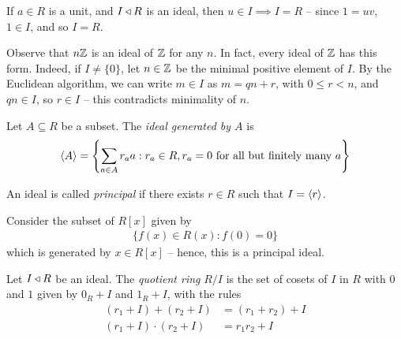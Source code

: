 \documentclass{../template/note}
\begin{document}
    \begin{remark*}
        If $a \in R$ is a unit, and $I \triangleleft R$ is an ideal, then $u \in I \implies I = R$ -- since $1 = uv$, $1 \in I$, and so $I = R$.
    \end{remark*}
    
    \begin{example}
        Observe that $n\mathbb Z$ is an ideal of $\mathbb Z$ for any $n$. In fact, every ideal of $\mathbb Z$ has this form. Indeed, if $I \neq \{0\}$, let $n \in \mathbb Z$ be the minimal positive element of $I$. By the Euclidean algorithm, we can write $m \in I$ as $m = qn + r$, with $0 \leq r < n$, and $qn \in I$, so $r \in I$ -- this contradicts minimality of $n$.
    \end{example}

    
    \begin{definition}
        Let $A \subseteq R$ be a subset. The \emph{ideal generated by $A$}
        is
        \begin{align*}
            \left \langle A \right \rangle = \left\{\sum_{a \in A}r_aa : r_a \in R, r_a = 0 \text{ for all but finitely many }a\right\}
        \end{align*}
    \end{definition}
    
    \begin{definition}
        An ideal is called \emph{principal} if there exists $r \in R$ such that $I = \left \langle r \right \rangle$.
    \end{definition}
    
    \begin{example}
        Consider the subset of $R[x]$ given by
        \begin{align*}
            \{f(x) \in R(x): f(0) = 0\}
        \end{align*}
        which is generated by $x \in R[x]$ -- hence, this is a principal ideal.        
    \end{example}
    
    \begin{definition}[Quotients]
        Let $I \triangleleft R$ be an ideal. The \emph{quotient ring} $R/I$ is the set of cosets of $I$ in $R$ with $0$ and $1$ given by $0_R + I$ and $1_R + I$, with the rules
        \begin{align*}
            (r_1 + I) + (r_2 + I) &= (r_1 + r_2) + I \\
            (r_1 + I) \cdot (r_2 + I) &= r_1r_2 + I
        \end{align*}
    \end{definition}
    
\end{document}
